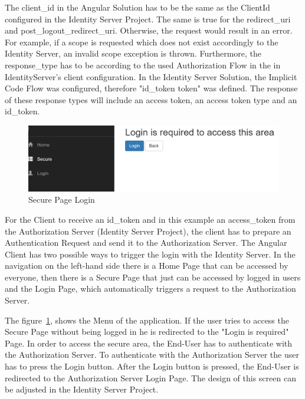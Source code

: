 The client\_id in the Angular Solution has to be the same as the ClientId configured in the Identity Server Project. The same is true for the redirect\_uri and post\_logout\_redirect\_uri. Otherwise, the request would result in an error. For example, if a scope is requested which does not exist accordingly to the Identity Server, an invalid scope exception is thrown. Furthermore, the response\_type has to be according to the used Authorization Flow in the in IdentityServer's client configuration. In the Identity Server Solution, the  Implicit Code Flow was configured, therefore "id\_token token" was defined. The response of these response types will include an access token, an access token type and an id\_token.  

\begin{figure}[h]
	\centering
	\includegraphics[width=0.8\linewidth]{images/secure_page_requires_login}
	\caption{Secure Page Login}
	\label{fig:securepagerequireslogin}
\end{figure}

For the Client to receive an id\_token and in this example an access\_token from the Authorization Server (Identity Server Project), the client has to prepare an Authentication Request and send it to the Authorization Server. The Angular Client has two possible ways to trigger the login with the Identity Server. In the navigation on the left-hand side there is a Home Page that can be accessed by everyone, then there is a Secure Page that just can be accessed by logged in users and the Login Page, which automatically triggers a request to the Authorization Server.



The figure~\ref{fig:securepagerequireslogin}, shows the Menu of the application. If the user tries to access the Secure Page without being logged in he is redirected to the "Login is required" Page. In order to access the secure area, the End-User has to authenticate with the Authorization Server.
To authenticate with the Authorization Server the user has to press the Login button. After the Login button is pressed, the End-User is redirected to the Authorization Server Login Page. The design of this screen can be adjusted in the Identity Server Project. 

